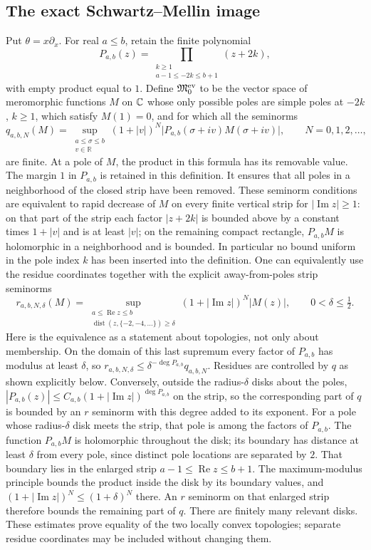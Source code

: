 \subsection{The exact Schwartz--Mellin image}
\label{sec:cq-Schwartz-Mellin-image}
Put $\theta=x\partial_x$. For real $a\leq b$, retain the finite polynomial
\[
 P_{a,b}(z)=\prod_{\substack{k\geq1\\a-1\leq-2k\leq b+1}}(z+2k),
\]
with empty product equal to $1$. Define $\mathfrak M_0^{\rm ev}$
to be the vector space of meromorphic functions $M$ on $\mathbb C$
whose only possible poles are simple poles at $-2k$, $k\geq1$,
which satisfy $M(1)=0$, and for which all the seminorms
\begin{equation}\label{eq:cq-Mellin-strip-seminorm}
 q_{a,b,N}(M)=
 \sup_{\substack{a\leq\sigma\leq b\\v\in\mathbb R}}
 (1+|v|)^N
 \bigl|P_{a,b}(\sigma+iv)M(\sigma+iv)\bigr|,
 \qquad N=0,1,2,\ldots,
\end{equation}
are finite. At a pole of $M$, the product in this formula has its
removable value. The margin $1$ in $P_{a,b}$ is retained in this
definition. It ensures that all poles in a neighborhood of the
closed strip have been removed. These seminorm conditions are
equivalent to rapid decrease of $M$ on every finite vertical strip
for $|\operatorname{Im}z|\geq1$: on that part of the strip each
factor $|z+2k|$ is bounded above by a constant times $1+|v|$
and is at least $|v|$; on the remaining compact rectangle,
$P_{a,b}M$ is holomorphic in a neighborhood and is bounded.
In particular no bound uniform in the pole index $k$ has been
inserted into the definition.
One can equivalently use the residue coordinates together with
the explicit away-from-poles strip seminorms
\[
 r_{a,b,N,\delta}(M)=
 \sup_{\substack{a\leq\operatorname{Re}z\leq b\\
       \operatorname{dist}(z,\{-2,-4,\ldots\})\geq\delta}}
   (1+|\operatorname{Im}z|)^N|M(z)|,
 \qquad 0<\delta\leq\tfrac12.
\]
Here is the equivalence as a statement about topologies, not only
about membership. On the domain of this last supremum every
factor of $P_{a,b}$ has modulus at least $\delta$, so
$r_{a,b,N,\delta}\leq\delta^{-\deg P_{a,b}}q_{a,b,N}$.
Residues are controlled by $q$ as shown explicitly below.
Conversely, outside the radius-$\delta$ disks about the poles,
$|P_{a,b}(z)|\leq C_{a,b}(1+|\operatorname{Im}z|)^{\deg P_{a,b}}$
on the strip, so the corresponding part of $q$ is bounded by
an $r$ seminorm with this degree added to its exponent.
For a pole whose radius-$\delta$ disk meets the strip, that pole
is among the factors of $P_{a,b}$. The function $P_{a,b}M$
is holomorphic throughout the disk; its boundary has distance
at least $\delta$ from every pole, since distinct pole locations
are separated by $2$. That boundary lies in the enlarged strip
$a-1\leq\operatorname{Re}z\leq b+1$. The maximum-modulus
principle bounds the product inside the disk by its boundary
values, and $(1+|\operatorname{Im}z|)^N\leq(1+\delta)^N$
there. An $r$ seminorm on that enlarged strip therefore bounds
the remaining part of $q$. There are finitely many relevant disks.
These estimates prove equality of the two locally convex
topologies; separate residue coordinates may be included without
changing them.

